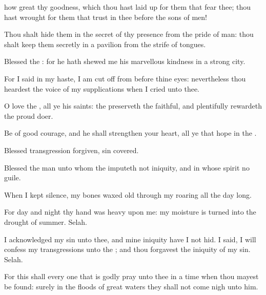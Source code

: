 {\Q {} how
great
{} thy
goodness, which thou hast laid
up for them that
fear thee;
{} thou hast
wrought for them that
trust in thee before the
sons of
men!


\par }{\Q {}Thou shalt
hide them in the
secret of thy
presence from the
pride of
man: thou shalt keep them
secretly in a
pavilion from the
strife of
tongues.


\par }{\Q {}Blessed
{} the
{}: for he hath shewed me his
marvellous
kindness in a
strong
city.


\par }{\Q {}For I
said in my
haste, I am cut
off from
before thine
eyes:
nevertheless thou
heardest the
voice of my
supplications when I
cried unto thee.


\par }{\Q {}O
love the
{}, all ye his
saints:
{} the
{}
preserveth the
faithful, and
plentifully
rewardeth the
proud
doer.


\par }{\Q {}Be of good
courage, and he shall
strengthen your
heart, all ye that
hope in the
{}.




\par }
{\Q {}Blessed
{}
transgression
{}
forgiven,
{}
sin
{}
covered.


\par }{\Q {}Blessed
{} the
man unto whom the
{}
imputeth not
iniquity, and in whose
spirit
{} no
guile.


\par }{\Q {}When I kept
silence, my
bones waxed
old through my
roaring all the
day long.


\par }{\Q {}For
day and
night thy
hand was
heavy upon me: my
moisture is
turned into the
drought of
summer.
Selah.


\par }{\Q {}I
acknowledged my
sin unto thee, and mine
iniquity have I not
hid. I
said, I will
confess my
transgressions unto the
{}; and thou
forgavest the
iniquity of my
sin.
Selah.


\par }{\Q {}For this shall every one that is
godly
pray unto thee in a
time when thou mayest be
found: surely in the
floods of
great
waters they shall not come
nigh unto him.


\par }{\BB \par }
